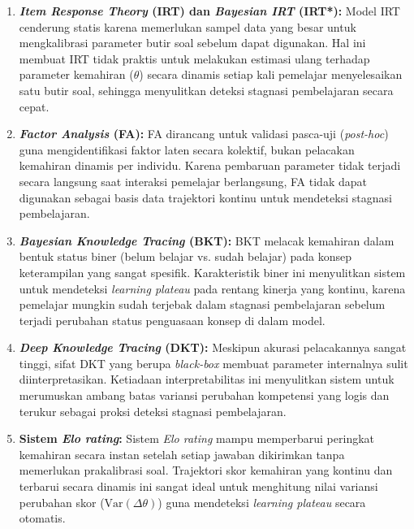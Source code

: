 \begin{enumerate}
    \item \textbf{\textit{Item Response Theory} (IRT) dan \textit{Bayesian IRT} (IRT*):} Model IRT cenderung statis karena memerlukan sampel data yang besar untuk mengkalibrasi parameter butir soal sebelum dapat digunakan. Hal ini membuat IRT tidak praktis untuk melakukan estimasi ulang terhadap parameter kemahiran ($\theta$) secara dinamis setiap kali pemelajar menyelesaikan satu butir soal, sehingga menyulitkan deteksi stagnasi pembelajaran secara cepat.

    \item \textbf{\textit{Factor Analysis} (FA):} FA dirancang untuk validasi pasca-uji (\textit{post-hoc}) guna mengidentifikasi faktor laten secara kolektif, bukan pelacakan kemahiran dinamis per individu. Karena pembaruan parameter tidak terjadi secara langsung saat interaksi pemelajar berlangsung, FA tidak dapat digunakan sebagai basis data trajektori kontinu untuk mendeteksi stagnasi pembelajaran.

    \item \textbf{\textit{Bayesian Knowledge Tracing} (BKT):} BKT melacak kemahiran dalam bentuk status biner (belum belajar vs. sudah belajar) pada konsep keterampilan yang sangat spesifik. Karakteristik biner ini menyulitkan sistem untuk mendeteksi \textit{learning plateau} pada rentang kinerja yang kontinu, karena pemelajar mungkin sudah terjebak dalam stagnasi pembelajaran sebelum terjadi perubahan status penguasaan konsep di dalam model.

    \item \textbf{\textit{Deep Knowledge Tracing} (DKT):} Meskipun akurasi pelacakannya sangat tinggi, sifat DKT yang berupa \textit{black-box} membuat parameter internalnya sulit diinterpretasikan. Ketiadaan interpretabilitas ini menyulitkan sistem untuk merumuskan ambang batas variansi perubahan kompetensi yang logis dan terukur sebagai proksi deteksi stagnasi pembelajaran.

    \item \textbf{Sistem \textit{Elo rating}:} Sistem \textit{Elo rating} mampu memperbarui peringkat kemahiran secara instan setelah setiap jawaban dikirimkan tanpa memerlukan prakalibrasi soal. Trajektori skor kemahiran yang kontinu dan terbarui secara dinamis ini sangat ideal untuk menghitung nilai variansi perubahan skor ($\text{Var}(\Delta\theta)$) guna mendeteksi \textit{learning plateau} secara otomatis.
\end{enumerate}

